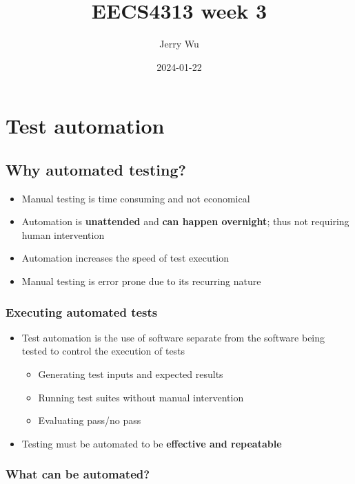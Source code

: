 \documentclass[12pt]{book}
\title{EECS4313 week 3}
\author{Jerry Wu}
\date{2024-01-22}
\begin{document}
\maketitle
\tableofcontents

\chapter{Test automation}

\section{Why automated testing?}

\begin{itemize}
    \item Manual testing is time consuming and not economical
    \item Automation is \textbf{unattended} and \textbf{can happen overnight}; thus not requiring human intervention
    \item Automation increases the speed of test execution
    \item Manual testing is error prone due to its recurring nature
\end{itemize}

\subsection{Executing automated tests}

\begin{itemize}
    \item Test automation is the use of software separate from the software being tested to control the execution of tests
    \begin{itemize}
        \item Generating test inputs and expected results
        \item Running test suites without manual intervention
        \item Evaluating pass/no pass
    \end{itemize}

    \item Testing must be automated to be \textbf{effective and repeatable}
\end{itemize}


\subsection{What can be automated?}
\end{document}
